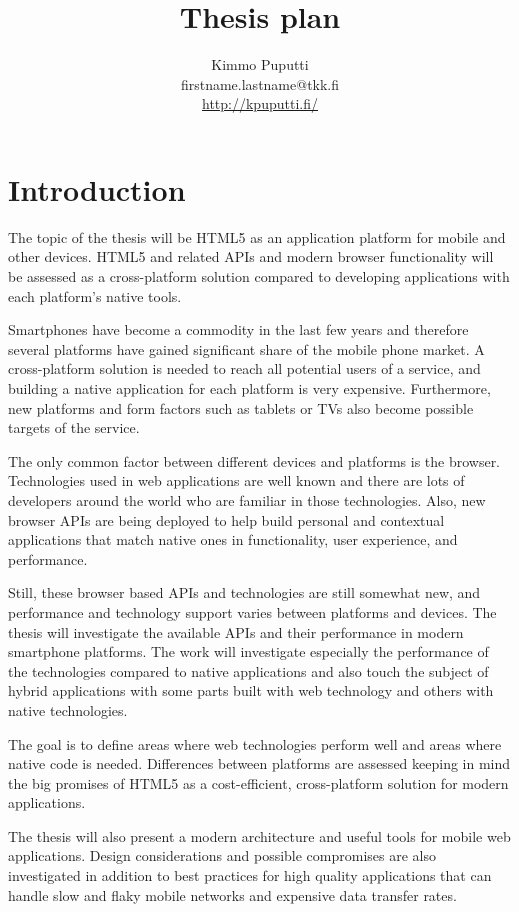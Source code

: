 \documentclass[a4paper,12pt]{article}
\title{Thesis plan}
\author{Kimmo Puputti\\firstname.lastname@tkk.fi\\\url{http://kpuputti.fi/}}
\begin{document}
\maketitle
\thispagestyle{empty}
\setcounter{page}{0}
\clearpage

\setcounter{section}{-1}
\section{Introduction}

The topic of the thesis will be HTML5 as an application platform for
mobile and other devices. HTML5 and related APIs and modern browser
functionality will be assessed as a cross-platform solution compared
to developing applications with each platform's native tools.

Smartphones have become a commodity in the last few years and
therefore several platforms have gained significant share of the
mobile phone market. A cross-platform solution is needed to reach all
potential users of a service, and building a native application for
each platform is very expensive. Furthermore, new platforms and form
factors such as tablets or TVs also become possible targets of the
service.

The only common factor between different devices and platforms is the
browser. Technologies used in web applications are well known and
there are lots of developers around the world who are familiar in
those technologies. Also, new browser APIs are being deployed to help
build personal and contextual applications that match native ones in
functionality, user experience, and performance.

Still, these browser based APIs and technologies are still somewhat
new, and performance and technology support varies between platforms
and devices. The thesis will investigate the available APIs and their
performance in modern smartphone platforms. The work will investigate
especially the performance of the technologies compared to native
applications and also touch the subject of hybrid applications with
some parts built with web technology and others with native
technologies.

The goal is to define areas where web technologies perform well and
areas where native code is needed. Differences between platforms are
assessed keeping in mind the big promises of HTML5 as a
cost-efficient, cross-platform solution for modern applications.

The thesis will also present a modern architecture and useful tools
for mobile web applications. Design considerations and possible
compromises are also investigated in addition to best practices for
high quality applications that can handle slow and flaky mobile
networks and expensive data transfer rates.
\end{document}
